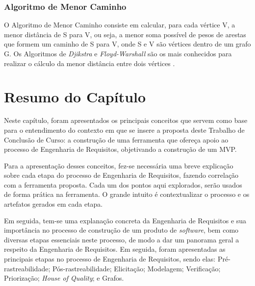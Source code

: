 \subsubsection{Algoritmo de Menor Caminho}

\label{sec:ssp}

O Algoritmo de Menor Caminho consiste em calcular, para cada vértice V, a menor distância de S para V, ou seja, a menor soma possível de pesos de arestas que formem um caminho de S para V, onde S e V são vértices dentro de um grafo G. Os Algoritmos de \textit{Djikstra} e \textit{Floyd-Warshall} são os mais conhecidos para realizar o cálculo da menor distância entre dois vértices \cite{even2011graph}.

\section{Resumo do Capítulo}

Neste capítulo, foram apresentados os principais conceitos que servem como base para o entendimento do contexto em que se insere a proposta deste Trabalho de Conclusão de Curso: a construção de uma ferramenta que ofereça apoio ao processo de Engenharia de Requisitos, objetivando a construção de um MVP.

Para a apresentação desses conceitos, fez-se necessária uma breve explicação sobre cada etapa do processo de Engenharia de Requisitos, fazendo correlação com a ferramenta proposta. Cada um dos pontos aqui explorados, serão usados de forma prática na ferramenta. O grande intuito é contextualizar o processo e os artefatos gerados em cada etapa.

Em seguida, tem-se uma explanação concreta da Engenharia de Requisitos e sua importância no processo de construção de um produto de \textit{software}, bem como diversas etapas essenciais neste processo, de modo a dar um panorama geral a respeito da Engenharia de Requisitos. Em seguida, foram apresentadas as principais etapas no processo de Engenharia de Requisitos, sendo elas: Pré-rastreabilidade; Pós-rastreabilidade; Elicitação; Modelagem; Verificação; Priorização; \textit{House of Quality}; e Grafos.